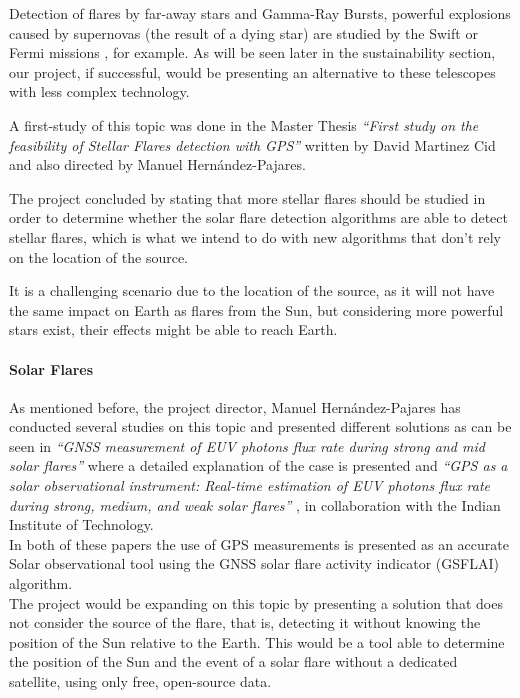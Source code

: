 Detection of flares by far-away stars and Gamma-Ray Bursts, powerful explosions caused by supernovas (the result of a dying star) are studied by the Swift or Fermi missions \cite{gehrels2013gamma}, for example. As will be seen later in the sustainability section, our project, if successful, would be presenting an alternative to these telescopes with less complex technology.

A first-study of this topic was done in the Master Thesis \textit{“First study on the feasibility of Stellar Flares detection with GPS”} \cite{martinez2016first} written by David Martinez Cid and also directed by Manuel Hernández-Pajares.

The project concluded by stating that more stellar flares should be studied in order to determine whether the solar flare detection algorithms are able to detect stellar flares, which is what we intend to do with new algorithms that don’t rely on the location of the source.

It is a challenging scenario due to the location of the source, as it will not have the same impact on Earth as flares from the Sun, but considering more powerful stars exist, their effects might be able to reach Earth.

\paragraph{Solar Flares}

As mentioned before, the project director, Manuel Hernández-Pajares has conducted several studies on this topic and presented different solutions as can be seen in \textit{“GNSS measurement of EUV photons flux rate during strong and mid solar flares”} \cite{hernandez2012gnss} where a detailed explanation of the case is presented and \textit{“GPS as a solar observational instrument: Real-time estimation of EUV photons flux rate during strong, medium, and weak solar flares”} \cite{singh2015gps}, in collaboration with the Indian Institute of Technology.\\

In both of these papers the use of GPS measurements is presented as an accurate Solar observational tool using the GNSS solar flare activity indicator (GSFLAI) algorithm.\\

The project would be expanding on this topic by presenting a solution that does not consider the source of the flare, that is, detecting it without knowing the position of the Sun relative to the Earth. This would be a tool able to determine the position of the Sun and the event of a solar flare without a dedicated satellite, using only free, open-source data.

